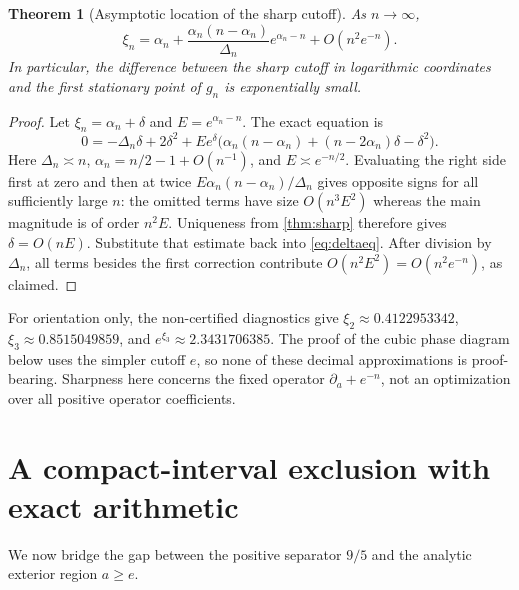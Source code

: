\documentclass[11pt]{article}
\numberwithin{equation}{section}
\newtheorem{theorem}{Theorem}[section]
\theoremstyle{definition}
\begin{document}
\begin{theorem}[Asymptotic location of the sharp cutoff]\label{thm:xiasympt}
As $n\to\infty$,
\begin{equation}\label{eq:xiasympt}
 \xi_n=\alpha_n+
 \frac{\alpha_n(n-\alpha_n)}{\Delta_n}e^{\alpha_n-n}
 +O(n^2e^{-n}).
\end{equation}
In particular, the difference between the sharp cutoff in logarithmic
coordinates and the first stationary point of $g_n$ is exponentially small.
\end{theorem}
\begin{proof}
Let $\xi_n=\alpha_n+\delta$ and $E=e^{\alpha_n-n}$. The exact equation is
\begin{equation}\label{eq:deltaeq}
 0=-\Delta_n\delta+2\delta^2+
 E e^\delta\bigl(\alpha_n(n-\alpha_n)+(n-2\alpha_n)\delta-\delta^2\bigr).
\end{equation}
Here $\Delta_n\asymp n$, $\alpha_n=n/2-1+O(n^{-1})$, and
$E\asymp e^{-n/2}$. Evaluating the right side first at zero and then at
twice $E\alpha_n(n-\alpha_n)/\Delta_n$ gives opposite signs for all
sufficiently large $n$: the omitted terms have size $O(n^3E^2)$ whereas
the main magnitude is of order $n^2E$. Uniqueness from \cref{thm:sharp}
therefore gives $\delta=O(nE)$. Substitute that estimate back into
\eqref{eq:deltaeq}. After division by $\Delta_n$, all terms besides the
first correction contribute $O(n^2E^2)=O(n^2e^{-n})$, as claimed.
\end{proof}

For orientation only, the non-certified diagnostics give
$\xi_2\approx0.4122953342$, $\xi_3\approx0.8515049859$, and
$e^{\xi_3}\approx2.3431706385$. The proof of the cubic phase diagram below
uses the simpler cutoff $e$, so none of these decimal approximations is
proof-bearing. Sharpness here concerns the fixed operator
$\partial_a+e^{-n}$, not an optimization over all positive operator coefficients.

\section{A compact-interval exclusion with exact arithmetic}
\label{sec:compact}
We now bridge the gap between the positive separator $9/5$ and the analytic
exterior region $a\geq e$.
\end{document}
